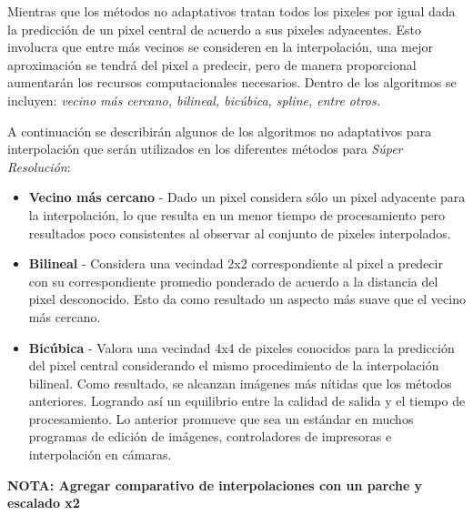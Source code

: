 Mientras que los métodos no adaptativos tratan todos los pixeles por igual
dada la predicción de un pixel central de acuerdo a sus pixeles adyacentes. Esto 
involucra que entre más vecinos se consideren en la interpolación, una mejor 
aproximación se tendrá del pixel a predecir, pero de manera proporcional 
aumentarán los recursos computacionales necesarios. Dentro de los algoritmos 
se incluyen: \emph{vecino más cercano, bilineal, bicúbica, spline, entre otros.}

A continuación se describirán algunos de los algoritmos no adaptativos para 
interpolación que serán utilizados en los diferentes métodos para \emph{Súper
Resolución}:
\begin{itemize}
    \item \textbf{Vecino más cercano} - Dado un pixel considera sólo un pixel 
    adyacente para la interpolación, lo que resulta en un menor tiempo de procesamiento
    pero resultados poco consistentes al observar al conjunto de pixeles interpolados. 
    \item \textbf{Bilineal} - Considera una vecindad 2x2 correspondiente al pixel
    a predecir con su correspondiente promedio ponderado de acuerdo a la distancia
    del pixel desconocido. Esto da como resultado un aspecto más suave que el vecino
    más cercano. 
    \item \textbf{Bicúbica} - Valora una vecindad 4x4 de pixeles conocidos para la
    predicción del pixel central considerando el mismo procedimiento de la 
    interpolación bilineal. Como resultado, se alcanzan imágenes más nítidas que los 
    métodos anteriores. Logrando así un equilibrio entre la calidad de salida y el 
    tiempo de procesamiento. Lo anterior promueve que sea un estándar en muchos programas
    de edición de imágenes, controladores de impresoras e interpolación en cámaras. 
\end{itemize}


\textbf{NOTA: Agregar comparativo de interpolaciones con un parche y escalado x2}

